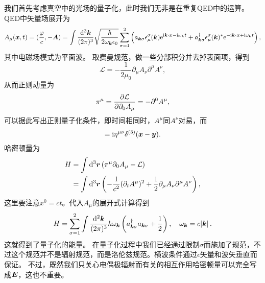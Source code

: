 \documentclass[UTF8, a4paper]{ctexart}
\newcommand*{\ee}{\mathrm{e}}
\newcommand*{\ii}{\mathrm{i}}
\begin{document}
我们首先考虑真空中的光场的量子化，此时我们无非是在重复QED中的运算。
QED中矢量场展开为
\begin{equation}
    A_\mu(\vb*{x}, t) = (\frac{\varphi}{c}, - \vb*{A}) = \int \frac{\dd[3]{\vb*{k}}}{(2\pi)^3} \sqrt{\frac{\hbar}{2\omega_{\vb*{k}} \epsilon_0}} \sum_{\sigma=1}^2 \left( a_{\vb*{k} \sigma} \epsilon_\mu^\sigma(\vb*{k}) \ee^{\ii \vb*{k} \cdot \vb*{x} - \ii \omega_{\vb*{k}} t} + a_{\vb*{k} \sigma}^\dagger \epsilon_\mu^\sigma(\vb*{k})^* \ee^{- \ii \vb*{k} \cdot \vb*{x} + \ii \omega_{\vb*{k}} t} \right),
\end{equation}
其中电磁场模式为平面波。
取费曼规范，做一些分部积分并去掉表面项，得到
\begin{equation}
    \mathcal{L} = - \frac{1}{2 \mu_0} \partial_\mu A_\nu \partial^\mu A^\nu,
\end{equation}
从而正则动量为
\begin{equation}
    \pi^\mu = \pdv{\mathcal{L}}{\partial_0 A_\mu} = - \partial^0 A^\mu,
\end{equation}
可以据此写出正则量子化条件，即时间相同时，$A^\mu$同$A^\nu$对易，而
\begin{equation}
    [A^\mu(\vb*{x}, t), \pi^\mu(\vb*{y}, t)] = \ii \eta^{\mu \nu} \delta^{(3)}(\vb*{x} - \vb*{y}).
\end{equation}
哈密顿量为
\[
    \begin{aligned}
        H &= \int \dd[3]{\vb*{r}} (\pi^\mu \partial_0 A_\mu - \mathcal{L}) \\
        &= \int \dd[3]{\vb*{r}} \left( - \frac{1}{c^2} (\partial_t A^\mu)^2 + \frac{1}{2} \partial_\mu A_\nu \partial^\mu A^\nu \right),
    \end{aligned}
\]
这里要注意$x^0 = c t$。代入$A_\mu$的展开式计算得到
\begin{equation}
    H = \sum_{\sigma=1}^2 \int \frac{\dd[2]{\vb*{k}}}{(2\pi)^3} \hbar \omega_{\vb*{k}} \left( a^\dagger_{\vb*{k} \sigma} a_{\vb*{k} \sigma} + \frac{1}{2} \right), \quad \omega_{\vb*{k}} = c \abs*{\vb*{k}}.
\end{equation}
这就得到了量子化的能量。
在量子化过程中我们已经通过限制$\sigma$而施加了规范，不过这个规范并不是辐射规范，而是洛伦兹规范。横波条件通过$\epsilon$矢量和波矢垂直而保证。
不过，既然我们只关心电偶极辐射而有关的相互作用哈密顿量可以完全写成$\vb*{E}$，这也不重要。
\end{document}

